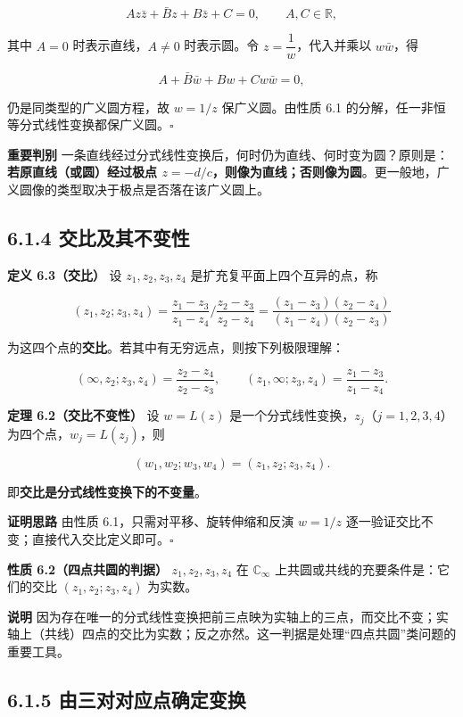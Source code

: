 \[
A z\bar z + \bar B z + B \bar z + C = 0,\qquad A,C \in \mathbb{R},
\]

其中 \(A=0\) 时表示直线，\(A\neq 0\) 时表示圆。令
\(z=\dfrac{1}{w}\)，代入并乘以 \(w\bar w\)，得

\[
A + \bar B \bar w + B w + C w\bar w = 0,
\]

仍是同类型的广义圆方程，故 \(w=1/z\) 保广义圆。由性质 6.1
的分解，任一非恒等分式线性变换都保广义圆。\(\square\)

\textbf{重要判别}
一条直线经过分式线性变换后，何时仍为直线、何时变为圆？原则是：\textbf{若原直线（或圆）经过极点
\(z=-d/c\)，则像为直线；否则像为圆}。更一般地，广义圆像的类型取决于极点是否落在该广义圆上。

\subsection{6.1.4
交比及其不变性}\label{ux4ea4ux6bd4ux53caux5176ux4e0dux53d8ux6027}

\textbf{定义 6.3（交比）} 设 \(z_1,z_2,z_3,z_4\)
是扩充复平面上四个互异的点，称

\[
(z_1,z_2;z_3,z_4)
= \frac{z_1-z_3}{z_1-z_4}\Big/\frac{z_2-z_3}{z_2-z_4}
= \frac{(z_1-z_3)(z_2-z_4)}{(z_1-z_4)(z_2-z_3)}
\]

为这四个点的\textbf{交比}。若其中有无穷远点，则按下列极限理解：

\[
(\infty, z_2; z_3, z_4)=\frac{z_2-z_4}{z_2-z_3},\qquad
(z_1, \infty; z_3, z_4)=\frac{z_1-z_3}{z_1-z_4}.
\]

\textbf{定理 6.2（交比不变性）} 设 \(w=L(z)\)
是一个分式线性变换，\(z_j\)（\(j=1,2,3,4\)）为四个点，\(w_j=L(z_j)\)，则

\[
(w_1,w_2;w_3,w_4) = (z_1,z_2;z_3,z_4).
\]

即\textbf{交比是分式线性变换下的不变量}。

\textbf{证明思路} 由性质 6.1，只需对平移、旋转伸缩和反演 \(w=1/z\)
逐一验证交比不变；直接代入交比定义即可。\(\square\)

\textbf{性质 6.2（四点共圆的判据）} \(z_1,z_2,z_3,z_4\) 在
\(\mathbb{C}_{\infty}\) 上共圆或共线的充要条件是：它们的交比
\((z_1,z_2;z_3,z_4)\) 为实数。

\textbf{说明}
因为存在唯一的分式线性变换把前三点映为实轴上的三点，而交比不变；实轴上（共线）四点的交比为实数；反之亦然。这一判据是处理``四点共圆''类问题的重要工具。

\subsection{6.1.5
由三对对应点确定变换}\label{ux7531ux4e09ux5bf9ux5bf9ux5e94ux70b9ux786eux5b9aux53d8ux6362}

